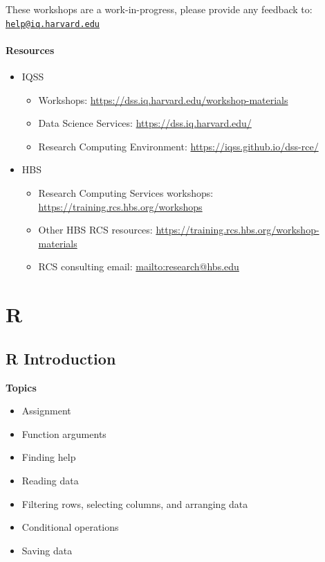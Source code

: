 \documentclass[]{book}
\providecommand{\tightlist}{%
  \setlength{\itemsep}{0pt}\setlength{\parskip}{0pt}}
\begin{document}
These workshops are a work-in-progress, please provide any feedback to: \href{mailto:help@iq.harvard.edu}{\nolinkurl{help@iq.harvard.edu}}

\hypertarget{resources}{%
\subsection{Resources}\label{resources}}

\begin{itemize}
\tightlist
\item
  IQSS

  \begin{itemize}
  \tightlist
  \item
    Workshops: \url{https://dss.iq.harvard.edu/workshop-materials}
  \item
    Data Science Services: \url{https://dss.iq.harvard.edu/}
  \item
    Research Computing Environment: \url{https://iqss.github.io/dss-rce/}
  \end{itemize}
\item
  HBS

  \begin{itemize}
  \tightlist
  \item
    Research Computing Services workshops: \url{https://training.rcs.hbs.org/workshops}
  \item
    Other HBS RCS resources: \url{https://training.rcs.hbs.org/workshop-materials}
  \item
    RCS consulting email: \url{mailto:research@hbs.edu}
  \end{itemize}
\end{itemize}

\hypertarget{part-r}{%
\part{R}\label{part-r}}

\hypertarget{r-introduction}{%
\chapter{R Introduction}\label{r-introduction}}

\textbf{Topics}

\begin{itemize}
\tightlist
\item
  Assignment
\item
  Function arguments
\item
  Finding help
\item
  Reading data
\item
  Filtering rows, selecting columns, and arranging data
\item
  Conditional operations
\item
  Saving data
\end{itemize}
\end{document}
